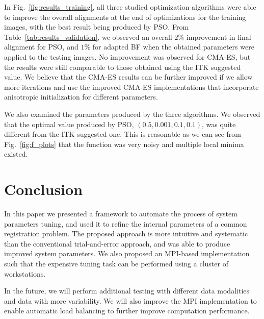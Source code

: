 \documentclass[]{spie}  %
\begin{document}
In Fig.~\ref{fig:results_training}, all three studied optimization algorithms were able to improve the overall alignments at the end of optimizations for the training images, with the best result being produced by PSO.
From Table~\ref{tab:results_validation}, we observed an overall $2\%$ improvement in final alignment for PSO, and $1\%$ for adapted BF when the obtained parameters were applied to the testing images. No improvement was observed for CMA-ES, but the results were still comparable to those obtained using the ITK suggested value. We believe that the CMA-ES results can be further improved if we allow more iterations and use the improved CMA-ES implementations that incorporate anisotropic initialization for different parameters.

We also examined the parameters produced by the three algorithms. We observed that the optimal value produced by PSO, $(0.5, 0.001, 0.1, 0.1)$, was quite different from the ITK suggested one. This is reasonable as we can see from Fig.~\ref{fig:f_plots} that the function was very noisy and multiple local minima existed.

\section{Conclusion}

In this paper we presented a framework to automate the process of system parameters tuning, and used it to refine the internal parameters of a common registration problem. The proposed approach is more intuitive and systematic than the conventional trial-and-error approach, and was able to produce improved system parameters. We also proposed an MPI-based implementation such that the expensive tuning task can be performed using a cluster of workstations.

In the future, we will perform additional testing with different data modalities and data with more variability. We will also improve the MPI implementation to enable automatic load balancing to further improve computation performance.

% 


\end{document}

